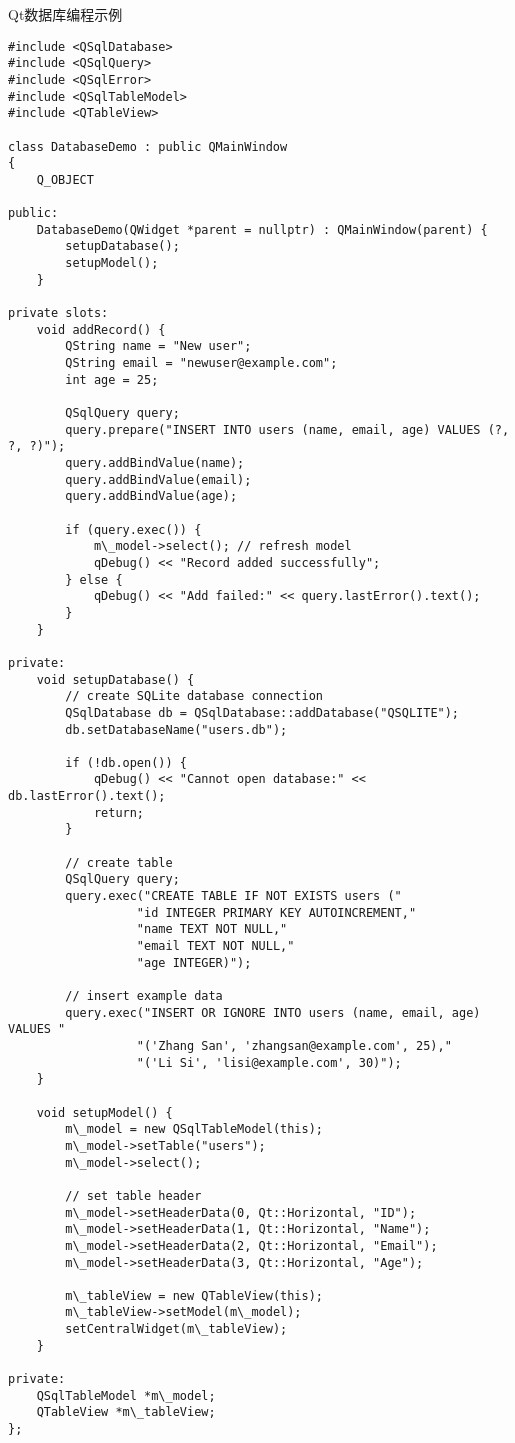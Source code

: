 \documentclass[UTF8,aspectratio=169]{beamer}
\begin{document}
\begin{frame}[fragile]{Qt数据库编程示例}
    \begin{lstlisting}
#include <QSqlDatabase>
#include <QSqlQuery>
#include <QSqlError>
#include <QSqlTableModel>
#include <QTableView>

class DatabaseDemo : public QMainWindow
{
    Q_OBJECT

public:
    DatabaseDemo(QWidget *parent = nullptr) : QMainWindow(parent) {
        setupDatabase();
        setupModel();
    }

private slots:
    void addRecord() {
        QString name = "New user";
        QString email = "newuser@example.com";
        int age = 25;

        QSqlQuery query;
        query.prepare("INSERT INTO users (name, email, age) VALUES (?, ?, ?)");
        query.addBindValue(name);
        query.addBindValue(email);
        query.addBindValue(age);

        if (query.exec()) {
            m\_model->select(); // refresh model
            qDebug() << "Record added successfully";
        } else {
            qDebug() << "Add failed:" << query.lastError().text();
        }
    }

private:
    void setupDatabase() {
        // create SQLite database connection
        QSqlDatabase db = QSqlDatabase::addDatabase("QSQLITE");
        db.setDatabaseName("users.db");

        if (!db.open()) {
            qDebug() << "Cannot open database:" << db.lastError().text();
            return;
        }

        // create table
        QSqlQuery query;
        query.exec("CREATE TABLE IF NOT EXISTS users ("
                  "id INTEGER PRIMARY KEY AUTOINCREMENT,"
                  "name TEXT NOT NULL,"
                  "email TEXT NOT NULL,"
                  "age INTEGER)");

        // insert example data
        query.exec("INSERT OR IGNORE INTO users (name, email, age) VALUES "
                  "('Zhang San', 'zhangsan@example.com', 25),"
                  "('Li Si', 'lisi@example.com', 30)");
    }

    void setupModel() {
        m\_model = new QSqlTableModel(this);
        m\_model->setTable("users");
        m\_model->select();

        // set table header
        m\_model->setHeaderData(0, Qt::Horizontal, "ID");
        m\_model->setHeaderData(1, Qt::Horizontal, "Name");
        m\_model->setHeaderData(2, Qt::Horizontal, "Email");
        m\_model->setHeaderData(3, Qt::Horizontal, "Age");

        m\_tableView = new QTableView(this);
        m\_tableView->setModel(m\_model);
        setCentralWidget(m\_tableView);
    }

private:
    QSqlTableModel *m\_model;
    QTableView *m\_tableView;
};
    \end{lstlisting}
\end{frame}
\end{document}
